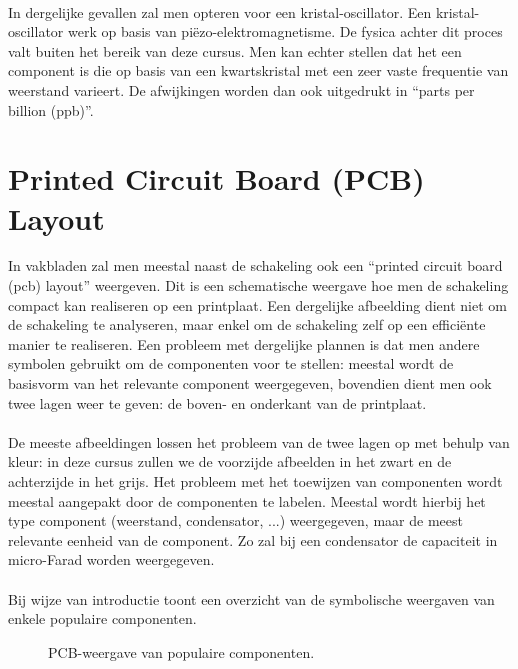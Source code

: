 \paragraph{}
In dergelijke gevallen zal men opteren voor een kristal-oscillator. Een kristal-oscillator werk op basis van pi\"ezo-elektromagnetisme. De fysica achter dit proces valt buiten het bereik van deze cursus. Men kan echter stellen dat het een component is die op basis van een kwartskristal met een zeer vaste frequentie van weerstand varieert. De afwijkingen worden dan ook uitgedrukt in ``parts per billion (ppb)''.
\section{Printed Circuit Board (PCB) Layout}
In vakbladen zal men meestal naast de schakeling ook een ``printed circuit board (pcb) layout'' weergeven. Dit is een schematische weergave hoe men de schakeling compact kan realiseren op een printplaat. Een dergelijke afbeelding dient niet om de schakeling te analyseren, maar enkel om de schakeling zelf op een effici\"ente manier te realiseren. Een probleem met dergelijke plannen is dat men andere symbolen gebruikt om de componenten voor te stellen: meestal wordt de basisvorm van het relevante component weergegeven, bovendien dient men ook twee lagen weer te geven: de boven- en onderkant van de printplaat.
\paragraph{}
De meeste afbeeldingen lossen het probleem van de twee lagen op met behulp van kleur: in deze cursus zullen we de voorzijde afbeelden in het zwart en de achterzijde in het grijs. Het probleem met het toewijzen van componenten wordt meestal aangepakt door de componenten te labelen. Meestal wordt hierbij het type component (weerstand, condensator, ...) weergegeven, maar de meest relevante eenheid van de component. Zo zal bij een condensator de capaciteit in micro-Farad worden weergegeven.
\paragraph{}
Bij wijze van introductie toont  een overzicht van de symbolische weergaven van enkele populaire componenten.
\begin{figure}[hbt]
\centering
{}
\caption{PCB-weergave van populaire componenten.}
\end{figure}
